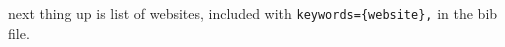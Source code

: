 \documentclass[output=book
  ,nonflat
  ,modfonts,
  ,colorlinks
  ,undecapitalize 
  ,collection
  ,showindex
  ,draftmode
  ,openreview
  ,nobabel
  ,booklanguage=french
  ,oldstylenumbers
  ]{langsci/langscibook}
\begin{document}
next thing up is list of websites, included with \verb+keywords={website},+ in the bib file. 

\printbibliography[keyword={website},title={Websites}]

 

%  
% 
% 
%  
%  
%  
%  
% 
% 
% 
%  
%  
%  
% 
%  

\end{document}
